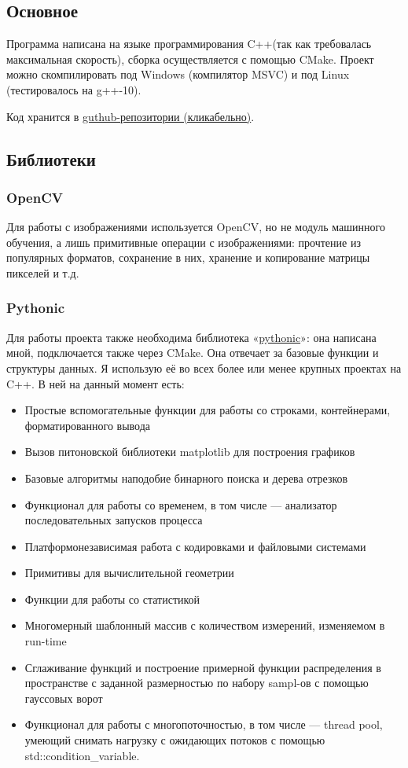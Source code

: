 \subsection{Основное}\label{subsec:major}
Программа написана на языке программирования C++(так как требовалась максимальная скорость), сборка осуществляется с помощью CMake.
Проект можно скомпилировать под Windows (компилятор MSVC) и под Linux (тестировалось на g++-10).

Код хранится в \href{https://github.com/donRumata03/Painter}{guthub-репозитории (кликабельно)}.

\subsection{Библиотеки}\label{subsec:libs}

\subsubsection{OpenCV}
Для работы с изображениями используется OpenCV, но не модуль машинного обучения, а лишь примитивные операции с изображениями:
прочтение из популярных форматов, сохранение в них, хранение и копирование матрицы пикселей и т.д.

\subsubsection{Pythonic}
Для работы проекта также необходима библиотека «\href{https://github.com/donRumata03/pythonic}{pythonic}»: она написана мной, подключается также через CMake.
Она отвечает за базовые функции и структуры данных.
Я использую её во всех более или менее крупных проектах на C++.
В ней на данный момент есть:
\begin{itemize}
    \item Простые вспомогательные функции для работы со строками, контейнерами, форматированного вывода
    \item Вызов питоновской библиотеки matplotlib для построения графиков
    \item Базовые алгоритмы наподобие бинарного поиска и дерева отрезков
    \item Функционал для работы со временем, в том числе — анализатор последовательных запусков процесса
    \item Платформонезависимая работа с кодировками и файловыми системами
    \item Примитивы для вычислительной геометрии
    \item Функции для работы со статистикой
    \item Многомерный шаблонный массив с количеством измерений, изменяемом в run-time
    \item Сглаживание функций и построение примерной функции распределения в пространстве с заданной размерностью по набору sampl-ов с помощью гауссовых ворот
    \item Функционал для работы с многопоточностью, в том числе — thread pool, умеющий снимать нагрузку с ожидающих потоков с помощью std::condition\_variable.
\end{itemize}

